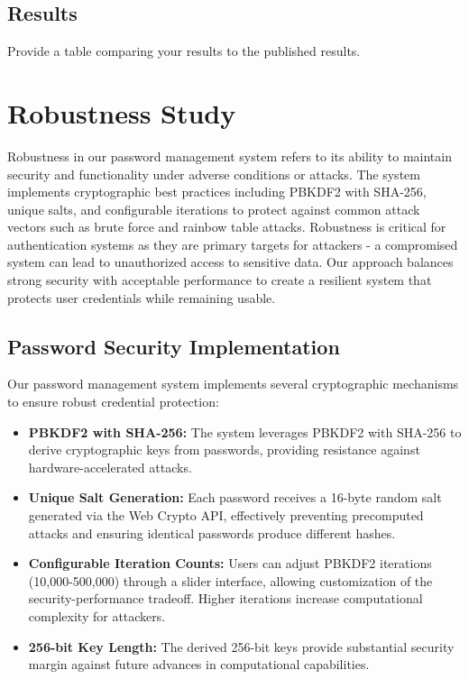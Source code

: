 \documentclass[11pt,a4paper]{article}
\begin{document}
\subsection{Results}
Provide a table comparing your results to the published results.

\section{Robustness Study}

Robustness in our password management system refers to its ability to maintain security and functionality under adverse conditions or attacks. The system implements cryptographic best practices including PBKDF2 with SHA-256, unique salts, and configurable iterations to protect against common attack vectors such as brute force and rainbow table attacks. Robustness is critical for authentication systems as they are primary targets for attackers - a compromised system can lead to unauthorized access to sensitive data. Our approach balances strong security with acceptable performance to create a resilient system that protects user credentials while remaining usable.

\subsection{Password Security Implementation}
Our password management system implements several cryptographic mechanisms to ensure robust credential protection:
\begin{itemize}
  \item \textbf{PBKDF2 with SHA-256:} The system leverages PBKDF2 with SHA-256 to derive cryptographic keys from passwords, providing resistance against hardware-accelerated attacks.
  \item \textbf{Unique Salt Generation:} Each password receives a 16-byte random salt generated via the Web Crypto API, effectively preventing precomputed attacks and ensuring identical passwords produce different hashes.
  \item \textbf{Configurable Iteration Counts:} Users can adjust PBKDF2 iterations (10,000-500,000) through a slider interface, allowing customization of the security-performance tradeoff. Higher iterations increase computational complexity for attackers.
  \item \textbf{256-bit Key Length:} The derived 256-bit keys provide substantial security margin against future advances in computational capabilities.
\end{itemize}
\end{document}
